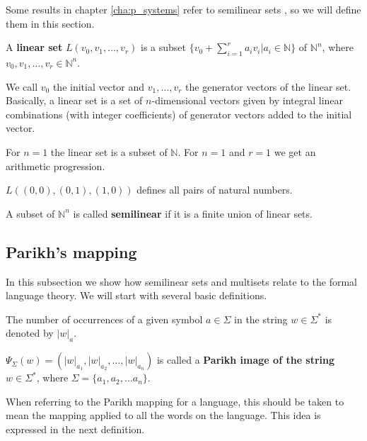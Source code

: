 Some results in chapter \ref{cha:p_systems} refer to  semilinear sets \cite{Ibarra:03:Catalytic}, so we will define them in this section.
\begin{definition}
  A {\bf linear set} $L(v_0,v_1,\ldots,v_r)$ is a subset $\{v_0+\sum\limits_{i=1}^r a_iv_i|a_i\in\mathbb N\}$ of $\mathbb N^n$, where $v_0,v_1,\ldots,v_r\in \mathbb N^n$.
\end{definition}

We call $v_0$ the initial vector and $v_1,\ldots,v_r$ the generator vectors of the linear set. Basically, a linear set is a set of $n$-dimensional vectors given by integral linear combinations (with integer coefficients) of generator vectors added to the initial vector.

\begin{example}
  For $n=1$ the linear set is a subset of $\mathbb N$. For $n=1$ and $r=1$ we get an arithmetic progression.
\end{example}

\begin{example}
  $L((0,0),(0,1),(1,0))$ defines all pairs of natural numbers.
\end{example}

\begin{definition}
  A subset of $\mathbb N^n$ is called {\bf semilinear} if it is a finite union of linear sets.
\end{definition}

\subsection{Parikh's mapping} %
\label{sec:parikh_s_mapping}

In this subsection we show how semilinear sets and multisets relate to the formal language theory. We will start with several basic definitions.

The number of occurrences of a given symbol $a\in \Sigma$ in the string $w\in \Sigma^*$ is denoted by $|w|_a$.

\begin{definition}
$\Psi_\Sigma(w)=(|w|_{a_1},|w|_{a_2},\ldots,|w|_{a_n})$ is called a {\bf Parikh image of the string} $w\in \Sigma^*$, where $\Sigma=\{a_1,a_2,\ldots a_n\}$.
\end{definition}

When referring to the  Parikh mapping for a language, this should be taken to mean the mapping applied to all the words on the language. This idea is expressed in the next definition. 

